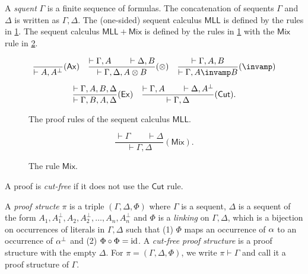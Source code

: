 A \emph{squent} \( \Gamma \) is a finite sequence of formulas.
The concatenation of sequents \( \Gamma \) and \( \Delta \) is written as \( \Gamma, \Delta \).
The (one-sided) sequent calculus \( \mathsf{MLL} \) is defined by the rules in \cref{fig:sequent-calculus-mll}.
The sequent calculus \( \mathsf{MLL+Mix} \) is defined by the rules in \cref{fig:sequent-calculus-mll} with the \( \mathsf{Mix} \) rule in \cref{fig:mix-rule}.
\begin{figure}[t]
    \begin{gather*}
        \dfrac{\mathstrut}{\vdash A, A^\bot}(\mathsf{Ax})
        \quad
        \dfrac{\vdash \Gamma, A \qquad \vdash \Delta, B}{\vdash \Gamma, \Delta, A \otimes B}(\otimes)
        \quad
        \dfrac{\vdash \Gamma, A, B}{\vdash \Gamma, A \llpar B}(\llpar)
        \\[5pt]
        \dfrac{\vdash \Gamma, A, B, \Delta}{\vdash \Gamma, B, A, \Delta}(\mathsf{Ex})
        \quad
        \dfrac{\vdash \Gamma, A \qquad \vdash \Delta, A^\bot}{\vdash \Gamma, \Delta}(\mathsf{Cut}).
    \end{gather*}
    \vspace{-3ex}
    \caption{The proof rules of the sequent calculus \( \mathsf{MLL} \).}
    \label{fig:sequent-calculus-mll}
\end{figure}
\begin{figure}[t]
    \begin{equation*}
        \dfrac{\vdash \Gamma \qquad \vdash \Delta}{\vdash \Gamma, \Delta}(\mathsf{Mix}).
    \end{equation*}
    \vspace{-3ex}
    \caption{The rule \( \mathsf{Mix} \).}
    \label{fig:mix-rule}
\end{figure}
A proof is \emph{cut-free} if it does not use the \( \mathsf{Cut} \) rule.

A \emph{proof structe} \( \pi \) is a triple \( (\Gamma, \Delta, \Phi) \) where \( \Gamma \) is a sequent, \( \Delta \) is a sequent of the form \( A_1, A_1^{\bot}, A_2, A_2^{\bot}, \dots, A_n, A_n^{\bot} \) and \( \Phi \) is a \emph{linking} on \( \Gamma,\Delta \), which is a bijection on occurrences of literals in \( \Gamma,\Delta \) such that (1) \( \Phi \) maps an occurrence of \( \alpha \) to an occurrence of \( \alpha^{\bot} \) and (2) \( \Phi \circ \Phi = \mathrm{id} \).
A \emph{cut-free proof structure} is a proof structure with the empty \( \Delta \).
For \( \pi = (\Gamma, \Delta, \Phi) \), we write \( \pi \vdash \Gamma \) and call it a proof structure of \( \Gamma \).

